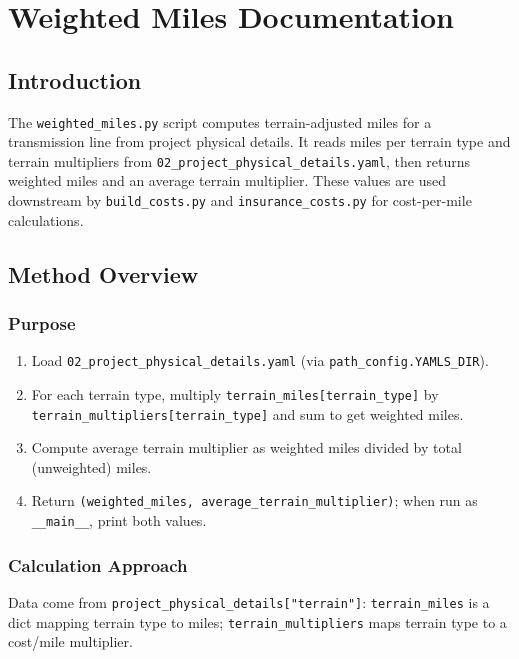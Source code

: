 \documentclass[ctcc_full_documentation.tex]{subfiles}
\begin{document}
\chapter{Weighted Miles Documentation}

\section{Introduction}

The \texttt{weighted\_miles.py} script computes terrain-adjusted miles for a transmission line from project physical details. It reads miles per terrain type and terrain multipliers from \texttt{02\_project\_physical\_details.yaml}, then returns weighted miles and an average terrain multiplier. These values are used downstream by \texttt{build\_costs.py} and \texttt{insurance\_costs.py} for cost-per-mile calculations.

\section{Method Overview}

\subsection{Purpose}

\begin{enumerate}
    \item Load \texttt{02\_project\_physical\_details.yaml} (via \texttt{path\_config.YAMLS\_DIR}).
    \item For each terrain type, multiply \texttt{terrain\_miles[terrain\_type]} by \texttt{terrain\_multipliers[terrain\_type]} and sum to get weighted miles.
    \item Compute average terrain multiplier as weighted miles divided by total (unweighted) miles.
    \item Return \texttt{(weighted\_miles, average\_terrain\_multiplier)}; when run as \texttt{\_\_main\_\_}, print both values.
\end{enumerate}

\subsection{Calculation Approach}

Data come from \texttt{project\_physical\_details["terrain"]}: \texttt{terrain\_miles} is a dict mapping terrain type to miles; \texttt{terrain\_multipliers} maps terrain type to a cost/mile multiplier.
\end{document}

